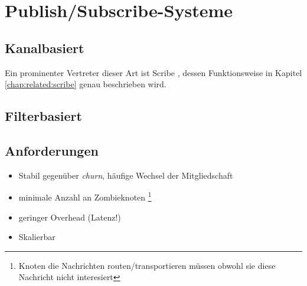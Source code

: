 \section{Publish/Subscribe-Systeme}
\label{chap:grundlagen:pubsub}

\subsection{Kanalbasiert}
Ein prominenter Vertreter dieser Art ist Scribe \cite{citeulike:345316}, dessen Funktionsweise in Kapitel \ref{chap:related:scribe} genau beschrieben wird.

\subsection{Filterbasiert}
\label{chap:grundlagen:pubsub:filterbased}
\cite{citeulike:854573} %
\cite{citeulike:6674153} %
\cite{citeulike:4291} %

\subsection{Anforderungen}
\begin{itemize}
\item Stabil gegenüber \emph{churn}, häufige Wechsel der Mitgliedschaft
\item minimale Anzahl an Zombieknoten \footnote{Knoten die Nachrichten routen/transportieren müssen obwohl sie diese Nachricht nicht interesiert}
\item geringer Overhead (Latenz!)
\item Skalierbar
\end{itemize}
